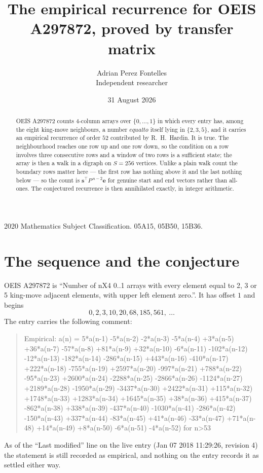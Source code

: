 \documentclass[11pt,a4paper]{article}
\title{The empirical recurrence for OEIS A297872, proved by transfer matrix}
\author{Adrian Perez Fontelles\\ \small Independent researcher}
\date{31 August 2026}
\theoremstyle{plain}
\theoremstyle{definition}
\begin{document}
\maketitle

\begin{abstract}
OEIS A297872 counts $4$-column arrays over $\{0,\dots,1\}$ in which every entry has,
among the eight king-move neighbours, a number $equal to$ itself lying in $\{2,3,5\}$, and it carries an empirical
recurrence of order $52$ contributed by R.~H.~Hardin. It is true. The neighbourhood
reaches one row up and one row down, so the condition on a row involves three consecutive
rows and a window of two rows is a sufficient state; the array is then a walk in a digraph
on $S=256$ vertices. Unlike a plain walk count the boundary rows matter here --- the first
row has nothing above it and the last nothing below --- so the count is
$\mathbf{s}^{\!\top}P^{\,n-2}\mathbf{e}$ for genuine start and end vectors rather than
all-ones. The conjectured recurrence is then annihilated exactly, in integer arithmetic.
\end{abstract}

\noindent\small 2020 Mathematics Subject Classification. 05A15, 05B50, 15B36.\normalsize

\section{The sequence and the conjecture}

OEIS A297872 is ``Number of nX4 0..1 arrays with every element equal to 2, 3 or 5 king-move adjacent elements, with upper left element zero.''. It has offset
$1$ and begins
\[
0, 2, 3, 10, 20, 68, 185, 561,\ \dots
\]
The entry carries the following comment:
\begin{quote}\small
Empirical: a(n) = 5*a(n-1) -5*a(n-2) -2*a(n-3) -5*a(n-4) +3*a(n-5) +36*a(n-7) -57*a(n-8) +81*a(n-9) +32*a(n-10) -6*a(n-11) -102*a(n-12) -12*a(n-13) -182*a(n-14) -286*a(n-15) +443*a(n-16) -410*a(n-17) +222*a(n-18) -755*a(n-19) +2597*a(n-20) -997*a(n-21) +788*a(n-22) -95*a(n-23) +2600*a(n-24) -2288*a(n-25) -2866*a(n-26) -1124*a(n-27) +2189*a(n-28) -1950*a(n-29) -3437*a(n-30) +2422*a(n-31) +115*a(n-32) +1748*a(n-33) +1283*a(n-34) +1645*a(n-35) +38*a(n-36) +415*a(n-37) -862*a(n-38) +338*a(n-39) -437*a(n-40) -1030*a(n-41) -286*a(n-42) -150*a(n-43) +337*a(n-44) -83*a(n-45) +41*a(n-46) -33*a(n-47) +71*a(n-48) +14*a(n-49) +8*a(n-50) -6*a(n-51) -4*a(n-52) for n>53
\end{quote}
As of the ``Last modified'' line on the live entry (Jan 07 2018 11:29:26, revision
4) the statement is still recorded as empirical, and nothing on the entry
records it as settled either way.
\end{document}
